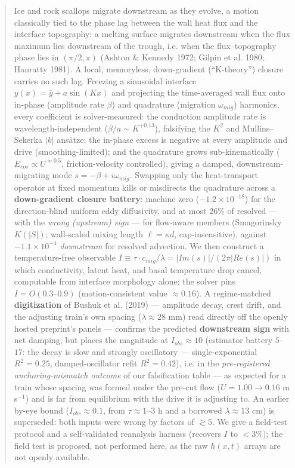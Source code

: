 \documentclass[tc, manuscript]{copernicus}
\begin{document}
\begin{abstract}
Ice and rock scallops migrate downstream as they evolve, a motion classically tied to the phase lag between the wall heat flux and the interface topography: a melting surface migrates downstream when the flux maximum lies downstream of the trough, i.e. when the flux–topography phase lies in $(\pi /2, \pi )$ (Ashton \& Kennedy 1972; Gilpin et al. 1980; Hanratty 1981). A local, memoryless, down-gradient (``K-theory'') closure carries no such lag. Freezing a sinusoidal interface $y(x)=\bar{y}+a \sin(Kx)$ and projecting the time-averaged wall flux onto in-phase (amplitude rate $\beta $) and quadrature (migration $\omega _{mig}$) harmonics, every coefficient is solver-measured: the conduction amplitude rate is wavelength-independent ($\beta /a \sim  K^{+0.13}$), falsifying the $K^{2}$ and Mullins–Sekerka $|k|$ ansätze; the in-phase excess is negative at every amplitude and drive (smoothing-limited); and the quadrature grows sub-kinematically ($E_{cos} \propto  U^{\approx 0.5}$, friction-velocity controlled), giving a damped, downstream-migrating mode $s = -\beta  + i\omega _{mig}$. Swapping only the heat-transport operator at fixed momentum kills or misdirects the quadrature across a \textbf{down-gradient closure battery}: machine zero ($-1.2\times 10^{-18}$) for the direction-blind uniform eddy diffusivity, and at most $26\%$ of resolved — with the \emph{wrong (upstream) sign} — for flow-aware members (Smagorinsky $K(|S|)$; wall-scaled mixing length $\ell =\kappa d$, cap-insensitive), against $-1.1\times 10^{-4}$ \emph{downstream} for resolved advection. We then construct a temperature-free observable $I \equiv  \tau \cdot c_{mig}/\lambda  = |Im(s)|/(2\pi |Re(s)|)$ in which conductivity, latent heat, and basal temperature drop cancel, computable from interface morphology alone; the solver pins $I = O(0.3\mbox{--}0.9)$ (motion-consistent value $\approx 0.16$). A regime-matched \textbf{digitization} of Bushuk et al. (2019) — amplitude decay, crest drift, and the adjusting train's own spacing ($\lambda \approx 28$ mm) read directly off the openly hosted preprint's panels — confirms the predicted \textbf{downstream sign} with net damping, but places the magnitude at $I_{obs}\approx 10$ (estimator battery $5$\mbox{--}$17$: the decay is slow and strongly oscillatory — single-exponential $R^{2}=0.25$, damped-oscillator refit $R^{2}=0.42$), i.e. in the \emph{pre-registered anchoring-mismatch outcome} of our falsification table — as expected for a train whose spacing was formed under the pre-cut flow ($U=1.00\to 0.16$ m s$^{-1}$) and is far from equilibrium with the drive it is adjusting to. An earlier by-eye bound ($I_{obs}\approx 0.1$, from $\tau \approx 1\mbox{--}3$ h and a borrowed $\lambda \approx 13$ cm) is superseded: both inputs were wrong by factors of $\gtrsim 5$. We give a field-test protocol and a self-validated reanalysis harness (recovers $I$ to $<3\%$); the field test is proposed, not performed here, as the raw $h(x,t)$ arrays are not openly available.
\end{abstract}
\end{document}
